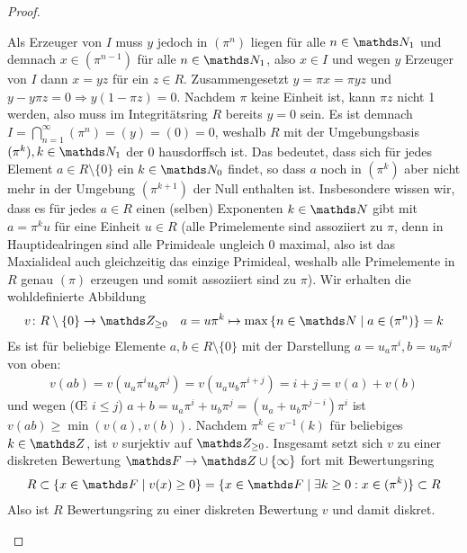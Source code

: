 \documentclass[ngerman,fontsize=11pt, paper=a4, parskip=half, titlepage=true, toc=bib]{scrartcl}
\begin{document}
\begin{Satz}
\begin{proof}
\begin{itemize}
      Als Erzeuger von $I$ muss $y$ jedoch in $(\pi^n)$ liegen für
      alle $n\in\N_1$ und demnach $x\in(\pi^{n-1})$ für alle
      $n\in\N_1$, also $x\in I$ und wegen $y$ Erzeuger von $I$ dann
      $x=yz$ für ein $z\in R$.
      Zusammengesetzt $y=\pi x=\pi yz$ und $y-y\pi z=0\Rightarrow
      y(1-\pi z)=0$.
      Nachdem $\pi$ keine Einheit ist, kann $\pi z$ nicht 1 werden,
      also muss im Integritätsring $R$ bereits $y=0$ sein.
      Es ist demnach $I=\bigcap_{n=1}^\infty(\pi^n)=(y)=(0)=0$, weshalb
      $R$ mit der Umgebungsbasis $(\pi^k),k\in\N_1$ der $0$ hausdorffsch ist.
      Das bedeutet, dass sich für jedes Element $a\in R\setminus\{0\}$
      ein $k\in\N_0$ findet, so dass $a$ noch in $(\pi^k)$ aber nicht
      mehr in der Umgebung $(\pi^{k+1})$ der Null enthalten ist.
      Insbesondere wissen wir, dass es für jedes $a\in R$ einen
      (selben) Exponenten $k\in\N$ gibt mit $a=\pi^ku$ für eine
      Einheit $u\in R$ (alle Primelemente sind assoziiert zu $\pi$,
      denn in Hauptidealringen sind alle Primideale ungleich 0
      maximal, also ist das  Maxialideal auch gleichzeitig das
      einzige Primideal, weshalb alle Primelemente in $R$ genau
      $(\pi)$ erzeugen und somit assoziiert sind zu $\pi$).
      Wir erhalten die wohldefinierte Abbildung
      \begin{gather*}
        v\colon R\setminus\{0\}\to \Z_{\geq 0}\quad 
        a=u\pi^k\mapsto \max\left\{n\in\N\mid a\in(\pi^n)\right\}=k
      \end{gather*}
      Es ist für beliebige Elemente $a, b\in R\setminus \{0\}$
      mit der Darstellung $a=u_a\pi^i,b=u_b\pi^j$ von oben:
      \begin{gather*}
        v(ab)=v(u_a\pi^iu_b\pi^j)=v(u_au_b\pi^{i+j})
        = i+j =v(a)+v(b)
      \end{gather*}
      und wegen (\OE{} $i\leq j$)
      $a+b=u_a\pi^i+u_b\pi^j=(u_a+u_b\pi^{j-i})\pi^i$
      ist $v(ab)\geq \min(v(a),v(b))$.
      Nachdem $\pi^k\in v^{-1}(k)$ für beliebiges $k\in\Z$, ist
      $v$ surjektiv auf $\Z_{\geq 0}$.
      Insgesamt setzt sich $v$ zu einer diskreten Bewertung
      $\F\to\Z\cup\{\infty\}$ fort mit Bewertungsring
      \begin{gather*}
        R\subset \{x\in\F\mid v(x)\geq 0\}=\{x\in\F\mid \exists
        k\geq 0: x\in(\pi^k)\}\subset R
      \end{gather*}
      Also ist $R$ Bewertungsring zu einer diskreten Bewertung $v$
      und damit diskret.
  \end{itemize}
  \end{proof}
\end{Satz}
\end{document}
